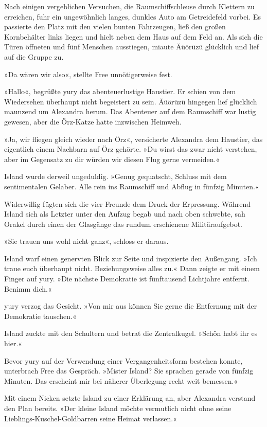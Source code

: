 Nach einigen vergeblichen Versuchen, die Raumschiffschleuse durch Klettern zu erreichen, fuhr ein ungewöhnlich langes, dunkles Auto am Getreidefeld vorbei. Es passierte den Platz mit den vielen bunten Fahrzeugen, ließ den großen Kornbehälter links liegen und hielt neben dem Haus auf dem Feld an. Als sich die Türen öffneten und fünf Menschen ausstiegen, miaute Äüörüzü glücklich und lief auf die Gruppe zu.

»Da wären wir also«, stellte Free unnötigerweise fest.

»Hallo«, begrüßte yury das abenteuerlustige Haustier. Er schien von dem Wiedersehen überhaupt nicht begeistert zu sein. Äüörüzü hingegen lief glücklich maunzend um Alexandra herum. Das Abenteuer auf dem Raumschiff war lustig gewesen, aber die Örz-Katze hatte inzwischen Heimweh.

»Ja, wir fliegen gleich wieder nach Örz«, versicherte Alexandra dem Haustier, das eigentlich einem Nachbarn auf Örz gehörte. »Du wirst das zwar nicht verstehen, aber im Gegensatz zu dir würden wir diesen Flug gerne vermeiden.«

Island wurde derweil ungeduldig. »Genug gequatscht, Schluss mit dem sentimentalen Gelaber. Alle rein ins Raumschiff und Abflug in fünfzig Minuten.«

Widerwillig fügten sich die vier Freunde dem Druck der Erpressung. Während Island sich als Letzter unter den Aufzug begab und nach oben schwebte, sah Orakel durch einen der Glasgänge das rundum erschienene Militäraufgebot.

»Sie trauen uns wohl nicht ganz«, schloss er daraus.

Island warf einen genervten Blick zur Seite und inspizierte den Außengang. »Ich traue euch überhaupt nicht. Beziehungsweise alles zu.« Dann zeigte er mit einem Finger auf yury. »Die nächste Demokratie ist fünftausend Lichtjahre entfernt. Benimm dich.«

yury verzog das Gesicht. »Von mir aus können Sie gerne die Entfernung mit der Demokratie tauschen.«

Island zuckte mit den Schultern und betrat die Zentralkugel. »Schön habt ihr es hier.«

Bevor yury auf der Verwendung einer Vergangenheitsform bestehen konnte, unterbrach Free das Gespräch. »Mister Island? Sie sprachen gerade von fünfzig Minuten. Das erscheint mir bei näherer Überlegung recht weit bemessen.«

Mit einem Nicken setzte Island zu einer Erklärung an, aber Alexandra verstand den Plan bereits. »Der kleine Island möchte vermutlich nicht ohne seine Lieblings-Kuschel-Goldbarren seine Heimat verlassen.«

